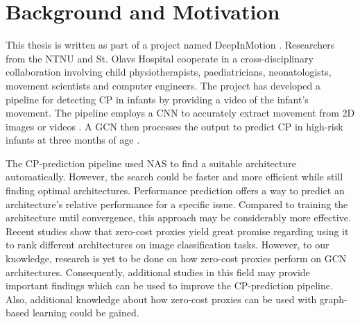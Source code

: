  \section{Background and Motivation}
This thesis is written as part of a project named DeepInMotion \autocite{deepinmotion}. Researchers from the \Gls{NTNU} and St. Olavs Hospital cooperate in a cross-disciplinary collaboration involving child physiotherapists, paediatricians, neonatologists, movement scientists and computer engineers. The project has developed a pipeline for detecting \Gls{CP} in infants by providing a video of the infant's movement. The pipeline employs a \Gls{CNN} to accurately extract movement from 2D images or videos \autocite{groos2021efficientpose}. A \gls{GCN} then processes the output to predict \gls{CP} in high-risk infants at three months of age \autocite{groos2022convolutional}. 

The \gls{CP}-prediction pipeline used \gls{NAS} to find a suitable architecture automatically. However, the search could be faster and more efficient while still finding optimal architectures. Performance prediction offers a way to predict an architecture's relative performance for a specific issue. Compared to training the architecture until convergence, this approach may be considerably more effective. Recent studies \autocite{abdelfattah2021zero, colin2022adeeperlook} show that zero-cost proxies yield great promise regarding using it to rank different architectures on image classification tasks. However, to our knowledge, research is yet to be done on how zero-cost proxies perform on \gls{GCN} architectures. Consequently, additional studies in this field may provide important findings which can be used to improve the \gls{CP}-prediction pipeline. Also, additional knowledge about how zero-cost proxies can be used with graph-based learning could be gained. 


